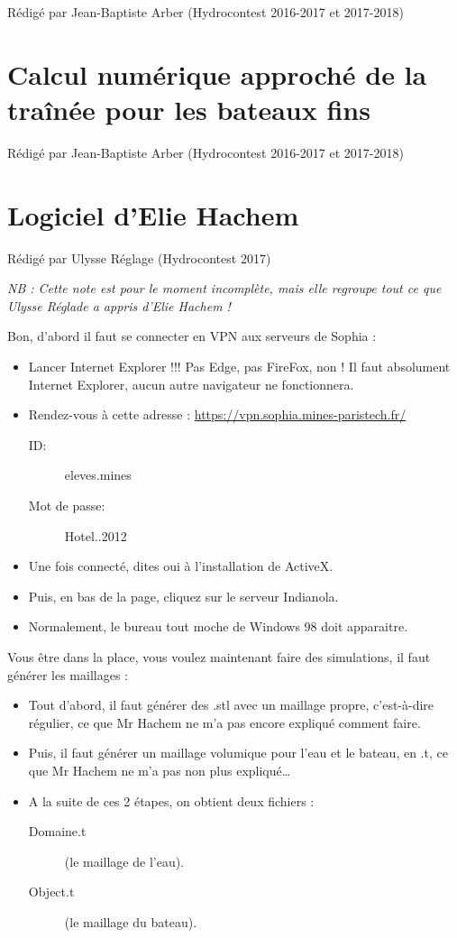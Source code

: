 \documentclass[a4paper, 11pt]{report}
\begin{document}
Rédigé par Jean-Baptiste Arber (Hydrocontest 2016-2017 et 2017-2018)

\chapter{Calcul numérique approché de la traînée pour les bateaux fins}

Rédigé par Jean-Baptiste Arber (Hydrocontest 2016-2017 et 2017-2018)

\chapter{Logiciel d'Elie Hachem}

Rédigé par Ulysse Réglage (Hydrocontest 2017)

\textit{NB : Cette note est pour le moment incomplète, mais elle regroupe tout ce que Ulysse Réglade a appris d'Elie Hachem !}

Bon, d’abord il faut se connecter en VPN aux serveurs de Sophia :

\begin{itemize}
\item Lancer Internet Explorer !!! Pas Edge, pas FireFox, non ! Il faut absolument Internet Explorer, aucun autre navigateur ne fonctionnera.
\item Rendez-vous à cette adresse : \url{https://vpn.sophia.mines-paristech.fr/}
\begin{description}
\item[ID:] eleves.mines
\item[Mot de passe:]Hotel..2012
\end{description}
\item Une fois connecté, dites oui à l’installation de ActiveX.
\item Puis, en bas de la page, cliquez sur le serveur Indianola.
\item Normalement, le bureau tout moche de Windows 98 doit apparaitre.
\end{itemize}

Vous être dans la place, vous voulez maintenant faire des simulations, il faut générer les maillages :

\begin{itemize}
\item Tout d’abord, il faut générer des .stl avec un maillage propre, c’est-à-dire régulier, ce que Mr Hachem ne m’a pas encore expliqué comment faire.
\item Puis, il faut générer un maillage volumique pour l’eau et le bateau, en .t, ce que Mr Hachem ne m’a pas non plus expliqué…
\item A la suite de ces 2 étapes, on obtient deux fichiers :
\begin{description}
\item[Domaine.t](le maillage de l’eau).
\item[Object.t ](le maillage du bateau).
\end{description}
\end{itemize}
\end{document}
